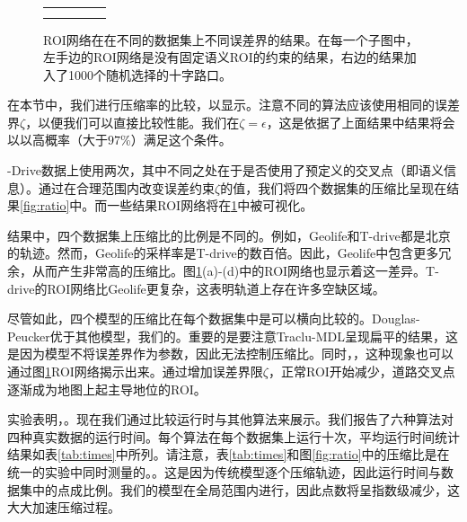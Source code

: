 \begin{figure}[!htb]
\begin{tabular}{ccccc}
{\begin{minipage}[b]{138mm}
\begin{minipage}[b]{101mm}
(g) $\epsilon = 10$ (km)  ~~~~(h) $\epsilon = 30$ (km) ~~~~ (i) $\epsilon = 50$ (km) \\
\end{minipage}
\end{minipage}
}\\
\end{tabular}
\caption{ROI网络在在不同的数据集上不同误差界的结果。在每一个子图中，左手边的ROI网络是没有固定语义ROI的约束的结果，右边的结果加入了1000个随机选择的十字路口。}
\label{fig:illustration}
\end{figure}

在本节中，我们进行压缩率的比较，以显示。注意不同的算法应该使用相同的误差界$\zeta $，以便我们可以直接比较性能。我们在$\zeta = \epsilon $，这是依据了上面结果中结果将会以以高概率（大于$97\%$）满足这个条件。

-Drive数据上使用两次，其中不同之处在于是否使用了预定义的交叉点（即语义信息）。通过在合理范围内改变误差约束$ \zeta $的值，我们将四个数据集的压缩比呈现在结果\ref{fig:ratio}中。而一些结果ROI网络将在\ref{fig:illustration}中被可视化。

结果中，四个数据集上压缩比的比例是不同的。例如，Geolife和T-drive都是北京的轨迹。然而，Geolife的采样率是T-drive的数百倍。因此，Geolife中包含更多冗余，从而产生非常高的压缩比。图\ref{fig:illustration}(a)-(d)中的ROI网络也显示着这一差异。T-drive的ROI网络比Geolife更复杂，这表明轨道上存在许多空缺区域。

尽管如此，四个模型的压缩比在每个数据集中是可以横向比较的。Douglas-Peucker优于其他模型，我们的。重要的是要注意Traclu-MDL呈现扁平的结果，这是因为模型不将误差界作为参数，因此无法控制压缩比。同时，，这种现象也可以通过图\ref{fig:illustration}ROI网络揭示出来。通过增加误差界限$\zeta$，正常ROI开始减少，道路交叉点逐渐成为地图上起主导地位的ROI。

实验表明，。现在我们通过比较运行时与其他算法来展示。我们报告了六种算法对四种真实数据的运行时间。每个算法在每个数据集上运行十次，平均运行时间统计结果如表\ref{tab:times}中所列。请注意，表\ref{tab:times}和图\ref{fig:ratio}中的压缩比是在统一的实验中同时测量的。。这是因为传统模型逐个压缩轨迹，因此运行时间与数据集中的点成比例。我们的模型在全局范围内进行，因此点数将呈指数级减少，这大大加速压缩过程。




